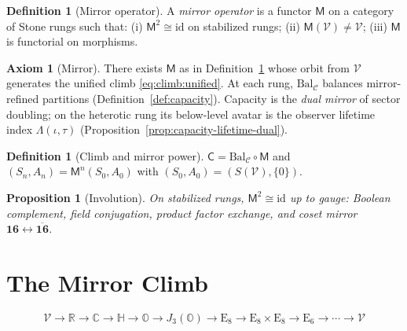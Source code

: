 \documentclass[aps,prd,onecolumn,amsmath,amssymb,nofootinbib,11pt]{revtex4-2}
\numberwithin{equation}{section}
\theoremstyle{plain}
\newtheorem{proposition}[theorem]{Proposition}
\theoremstyle{definition}
\newtheorem{axiom}[theorem]{Axiom}
\newtheorem{definition}[theorem]{Definition}
\theoremstyle{remark}
\newcommand{\R}{\mathbb{R}}
\newcommand{\C}{\mathbb{C}}
\newcommand{\Quat}{\mathbb{H}}
\newcommand{\Oct}{\mathbb{O}}
\newcommand{\jalg}{J_3(\mathbb{O})}
\newcommand{\E}[1]{\mathrm{E}_{#1}}
\newcommand{\Void}{\mathcal{V}}
\newcommand{\Mirror}{\mathsf{M}}
\newcommand{\Climb}{\mathsf{C}}
\begin{document}
\begin{definition}[Mirror operator]\label{def:mirror}
A \emph{mirror operator} is a functor $\Mirror$ on a category of Stone rungs
such that: (i) $\Mirror^2\cong\mathrm{id}$ on stabilized rungs; (ii)
$\Mirror(\Void)\neq\Void$; (iii) $\Mirror$ is functorial on morphisms.
\end{definition}

\begin{axiom}[Mirror]\label{ax:mirror}
There exists $\Mirror$ as in Definition~\ref{def:mirror} whose orbit from
$\Void$ generates the unified climb \eqref{eq:climb:unified}. At each rung,
$\mathrm{Bal}_{\mathcal{C}}$ balances mirror-refined partitions
(Definition~\ref{def:capacity}). Capacity is the \emph{dual mirror} of
sector doubling; on the heterotic rung its below-level avatar is the observer
lifetime index $\Lambda(\iota,\tau)$
(Proposition~\ref{prop:capacity-lifetime-dual}).
\end{axiom}

\begin{definition}[Climb and mirror power]\label{def:climb}
$\Climb=\mathrm{Bal}_{\mathcal{C}}\circ\Mirror$ and
$(S_n,A_n)=\Mirror^n(S_0,A_0)$ with $(S_0,A_0)=(S(\Void),\{0\})$.
\end{definition}

\begin{proposition}[Involution]\label{prop:mirror:involution}
On stabilized rungs, $\Mirror^2\cong\mathrm{id}$ up to gauge: Boolean
complement, field conjugation, product factor exchange, and coset mirror
$\mathbf{16}\leftrightarrow\overline{\mathbf{16}}$.
\end{proposition}%
\section{The Mirror Climb}
\label{sec:climb}

\begin{equation}\label{eq:climb:unified}
  \Void\to\R\to\C\to\Quat\to\Oct\to\jalg\to\E{8}\to\E{8}\times\E{8}\to\E{6}\to\cdots\to\Void
\end{equation}
\end{document}
